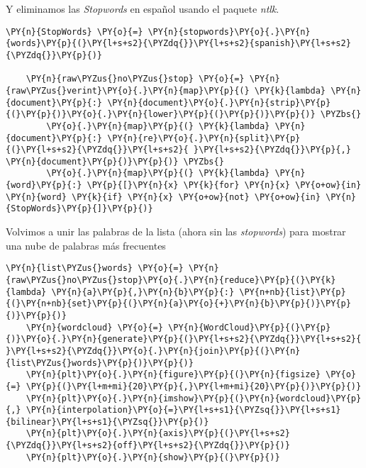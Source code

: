     
    
Y eliminamos las \textit{Stopwords} en español usando el paquete \textit{ntlk}.

\vspace{0.5cm}
    
        \begin{tcolorbox}[breakable, size=fbox, boxrule=1pt, pad at break*=1mm,colback=cellbackground, colframe=cellborder]
    \begin{Verbatim}[commandchars=\\\{\}]
    \PY{n}{StopWords} \PY{o}{=} \PY{n}{stopwords}\PY{o}{.}\PY{n}{words}\PY{p}{(}\PY{l+s+s2}{\PYZdq{}}\PY{l+s+s2}{spanish}\PY{l+s+s2}{\PYZdq{}}\PY{p}{)}
    
    \PY{n}{raw\PYZus{}no\PYZus{}stop} \PY{o}{=} \PY{n}{raw\PYZus{}verint}\PY{o}{.}\PY{n}{map}\PY{p}{(} \PY{k}{lambda} \PY{n}{document}\PY{p}{:} \PY{n}{document}\PY{o}{.}\PY{n}{strip}\PY{p}{(}\PY{p}{)}\PY{o}{.}\PY{n}{lower}\PY{p}{(}\PY{p}{)}\PY{p}{)} \PYZbs{}
    	\PY{o}{.}\PY{n}{map}\PY{p}{(} \PY{k}{lambda} \PY{n}{document}\PY{p}{:} \PY{n}{re}\PY{o}{.}\PY{n}{split}\PY{p}{(}\PY{l+s+s2}{\PYZdq{}}\PY{l+s+s2}{ }\PY{l+s+s2}{\PYZdq{}}\PY{p}{,} \PY{n}{document}\PY{p}{)}\PY{p}{)} \PYZbs{}
        \PY{o}{.}\PY{n}{map}\PY{p}{(} \PY{k}{lambda} \PY{n}{word}\PY{p}{:} \PY{p}{[}\PY{n}{x} \PY{k}{for} \PY{n}{x} \PY{o+ow}{in} \PY{n}{word} \PY{k}{if} \PY{n}{x} \PY{o+ow}{not} \PY{o+ow}{in} \PY{n}{StopWords}\PY{p}{]}\PY{p}{)}
    \end{Verbatim}
    \end{tcolorbox}
    
       Volvimos a unir las palabras de la lista (ahora sin las \textit{stopwords}) para mostrar una nube de  palabras más frecuentes
    
        \begin{tcolorbox}[breakable, size=fbox, boxrule=1pt, pad at break*=1mm,colback=cellbackground, colframe=cellborder]
    \begin{Verbatim}[commandchars=\\\{\}]
    \PY{n}{list\PYZus{}words} \PY{o}{=} \PY{n}{raw\PYZus{}no\PYZus{}stop}\PY{o}{.}\PY{n}{reduce}\PY{p}{(}\PY{k}{lambda} \PY{n}{a}\PY{p}{,}\PY{n}{b}\PY{p}{:} \PY{n+nb}{list}\PY{p}{(}\PY{n+nb}{set}\PY{p}{(}\PY{n}{a}\PY{o}{+}\PY{n}{b}\PY{p}{)}\PY{p}{)}\PY{p}{)}  
    \PY{n}{wordcloud} \PY{o}{=} \PY{n}{WordCloud}\PY{p}{(}\PY{p}{)}\PY{o}{.}\PY{n}{generate}\PY{p}{(}\PY{l+s+s2}{\PYZdq{}}\PY{l+s+s2}{ }\PY{l+s+s2}{\PYZdq{}}\PY{o}{.}\PY{n}{join}\PY{p}{(}\PY{n}{list\PYZus{}words}\PY{p}{)}\PY{p}{)}
    \PY{n}{plt}\PY{o}{.}\PY{n}{figure}\PY{p}{(}\PY{n}{figsize} \PY{o}{=} \PY{p}{(}\PY{l+m+mi}{20}\PY{p}{,}\PY{l+m+mi}{20}\PY{p}{)}\PY{p}{)}
    \PY{n}{plt}\PY{o}{.}\PY{n}{imshow}\PY{p}{(}\PY{n}{wordcloud}\PY{p}{,} \PY{n}{interpolation}\PY{o}{=}\PY{l+s+s1}{\PYZsq{}}\PY{l+s+s1}{bilinear}\PY{l+s+s1}{\PYZsq{}}\PY{p}{)}
    \PY{n}{plt}\PY{o}{.}\PY{n}{axis}\PY{p}{(}\PY{l+s+s2}{\PYZdq{}}\PY{l+s+s2}{off}\PY{l+s+s2}{\PYZdq{}}\PY{p}{)}
    \PY{n}{plt}\PY{o}{.}\PY{n}{show}\PY{p}{(}\PY{p}{)}
    \end{Verbatim}
    \end{tcolorbox}
    
